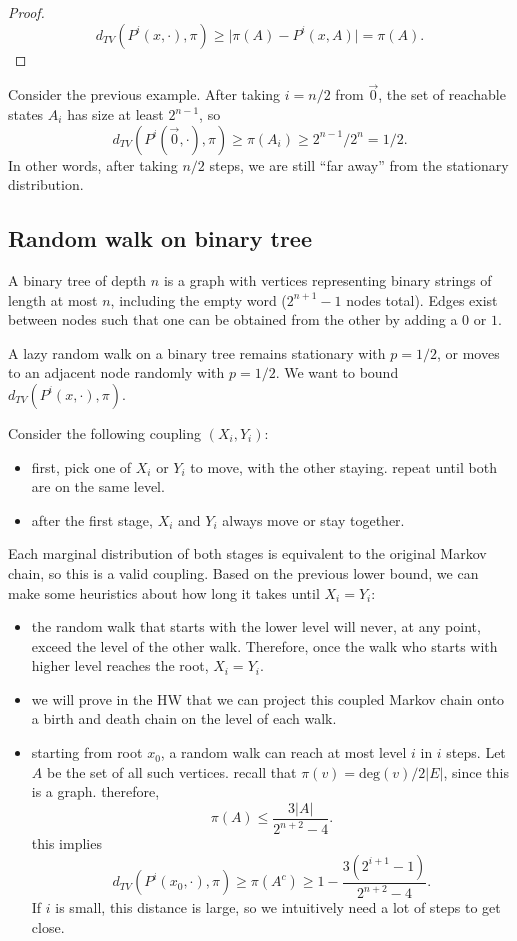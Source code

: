 \begin{proof}
\[d_{TV}(P^i(x,\cdot),\pi)\geq \vert \pi(A) - P^i(x,A)\vert = \pi(A).\]
\end{proof}

Consider the previous example. After taking $i=n/2$ from $\vec{0}$, the set of reachable states $A_i$ has size at least $2^{n-1}$, so 
\[d_{TV}(P^i(\vec{0},\cdot),\pi) \geq \pi(A_i) \geq 2^{n-1}/2^n = 1/2.\]
In other words, after taking $n/2$ steps, we are still ``far away'' from the stationary distribution. 

\subsection{Random walk on binary tree}

\begin{definition}

A binary tree of \ac{depth} $n$ is a graph with vertices representing binary strings of length at most $n$, including the empty word ($2^{n+1}-1$ nodes total). Edges exist between nodes such that one can be obtained from the other by adding a $0$ or $1$. 
\end{definition}

A lazy random walk on a binary tree remains stationary with $p=1/2$, or moves to an adjacent node randomly with $p=1/2$. We want to bound $d_{TV}(P^i(x,\cdot), \pi)$. 

Consider the following coupling $(X_i,Y_i)$: 
\begin{itemize}
    \item first, pick one of $X_i$ or $Y_i$ to move, with the other staying. repeat until both are on the same level. 
    \item after the first stage, $X_i$ and $Y_i$ always move or stay together. 
\end{itemize}
Each marginal distribution of both stages is equivalent to the original Markov chain, so this is a valid coupling. Based on the previous lower bound, we can make some heuristics about how long it takes until $X_i=Y_i$:

\begin{itemize}
    \item the random walk that starts with the lower level will never, at any point, exceed the level of the other walk. Therefore, once the walk who starts with higher level reaches the root, $X_i=Y_i$.
    \item we will prove in the HW that we can project this coupled Markov chain onto a birth and death chain on the level of each walk. 
    \item starting from root $x_0$, a random walk can reach at most level $i$ in $i$ steps. Let $A$ be the set of all such vertices. recall that $\pi(v) = \text{deg}(v)/2\vert E\vert$, since this is a graph. therefore, 
    \[\pi(A)\leq \frac{3\vert A\vert}{2^{n+2}-4}.\]
    this implies 
    \[d_{TV}(P^i(x_0, \cdot), \pi)\geq \pi(A^c) \geq 1-\frac{3(2^{i+1}-1)}{2^{n+2}-4}.\]
    If $i$ is small, this distance is large, so we intuitively need a lot of steps to get close. 
\end{itemize}

